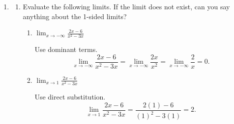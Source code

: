 \documentclass{article}
\begin{document}
\begin{enumerate}
  \begin{solution}
    When a non-piecewise function is given with its formula, we should try to use direct substitution. If
    direct substitution gives $\frac{0}{0}$, a good strategy is to try to factor and cancel. 
    If direct substitution gives
    $\frac{a}{0}$, where $a$ is a non-zero number, then we should determine whether the function is increasing
    or decreasing without bound and consider one-sided limits.

    For limits at infinity, a good strategy is to identify the dominant terms and rewrite the limit by discarding
    all but the dominant terms.

    For piecewise functions, good strategies are to identify the relevant pieces and to consider
    one-sided limits when necessary.

    Lastly, be on the lookout for limits involving the definition of the derivative.
  \end{solution}

\item 
  \begin{enumerate}
  \item Evaluate the following limits. If the limit does not exist, can you say anything about the 1-sided limits?

    \begin{enumerate}
    \item
      \begin{problem}[\stretch{0.5}]
        $\displaystyle \lim_{x \to -\infty} \frac{2x - 6}{x^2 - 3x}$
      \end{problem}

      \begin{solution}
      Use dominant terms.
        \[
            \lim_{x \to -\infty} \frac{2x-6}{x^2-3x} = \lim_{x \to -\infty} \frac{2x}{x^2} 
            = \lim_{x \to -\infty} \frac{2}{x} 
            = 0.
        \]
      \end{solution}

    \item
      \begin{problem}[\stretch{0.5}]
        $\displaystyle \lim_{x \to 1} \frac{2x - 6}{x^2 - 3x}$
      \end{problem}

      \begin{solution}
      Use direct substitution.
        \[
          \lim_{x \to 1} \frac{2x - 6}{x^2 - 3x} = \frac{2(1)-6}{(1)^2-3(1)} 
          = 2.
        \]
      \end{solution}


\end{enumerate}
\end{enumerate}
\end{enumerate}
\end{document}

